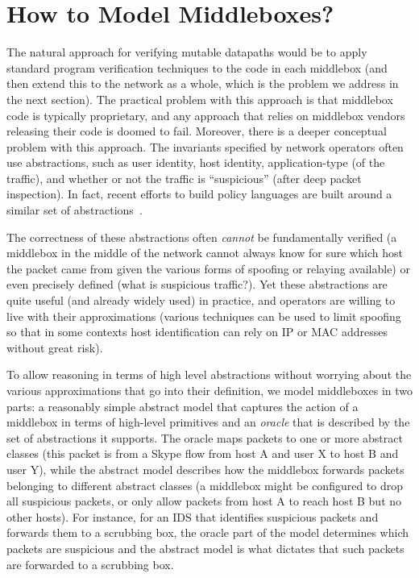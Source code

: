 \section{How to Model Middleboxes?}
\label{sec:mbmodel}
The natural approach for verifying mutable datapaths would be to apply standard program verification techniques to the code in each middlebox (and then extend this to the network as a whole, which is the problem we address in the next section). The practical problem with this approach is that middlebox code is typically proprietary, and any approach that relies on middlebox vendors releasing their code is doomed to fail.
Moreover, there is a deeper conceptual problem with this approach. The invariants specified by network operators often use abstractions, such as user identity, host identity, application-type (of the traffic), and whether or not the traffic is ``suspicious'' (\eg after deep packet inspection). In fact, recent efforts to build policy languages are built around a similar set of abstractions~\cite{congress}.

The correctness of these abstractions often {\em cannot} be fundamentally verified (\eg a middlebox in the middle of the network cannot always know for sure which host the packet came from given the various forms of spoofing or relaying available) or even precisely defined (\eg what is suspicious traffic?). Yet these abstractions are quite useful (and already widely used) in practice, and operators are willing to live with their approximations (\eg various techniques can be used to limit spoofing so that in some contexts host identification can rely on IP or MAC addresses without great risk).

\cbstart
To allow reasoning in terms of high level abstractions without worrying about the various approximations that go into their definition, we model middleboxes in two parts: a reasonably simple abstract model that captures the action of a middlebox in terms of high-level primitives and an {\em oracle} that is described by the set of abstractions it supports. The oracle maps packets to one or more abstract classes (\eg this packet is from a Skype flow from host A and user X to host B and user Y), while the abstract model describes how the middlebox forwards packets belonging to different abstract classes (\eg a middlebox might be configured to drop all suspicious packets, or only allow packets from host A to reach host B but no other hosts). For instance, for an IDS that identifies suspicious packets and forwards them to a scrubbing box, the oracle part of the model determines which packets are suspicious and the abstract model is what dictates that such packets are forwarded to a scrubbing box.
\cbend

